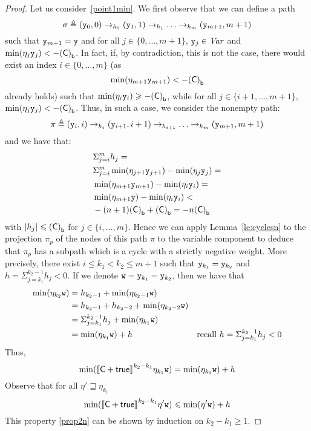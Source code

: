 \begin{proof}
  Let us consider~\ref{point1min}. We first observe that we
  can define a path
  \begin{equation}
    \label{eq:fixn}
    \sigma \veq (\var[y]_0, 0) \to_{h_0} (\var[y]_1, 1) \to_{h_1}
    \ldots \to_{h_m} (\var[y]_{m+1}, m+1)
  \end{equation}
  such that \(\var[y]_{m+1}=\var[y]\) and for all \(j \in \{0,\ldots, m+1\}\), 
  \(\var[y]_j\in \Var\)  and
  \(\min(\eta_{j} \var[y]_{j}) < -\lbound{\com}\).
  In fact, if, by contradiction, this is not the case, there would
  exist an index \(i \in \{0,\ldots, m\}\) (as
  \[\min(\eta_{m+1} \var[y]_{m+1}) < -\lbound{\com}\] already holds)
  such that \(\min(\eta_{i} \var[y]_{i}) \geq -\lbound{\com}\), while
  for all \(j \in \{i+1,\ldots, m+1\}\),
  \(\min(\eta_{j} \var[y]_j) < -\lbound{\com}\).  Thus, in such a
  case, we consider the nonempty path:
  \[\pi \veq (\var[y]_i, i) \to_{h_i} (\var[y]_{i+1}, i+1) \to_{h_{i+1}} \ldots
  \to_{h_m} (\var[y]_{m+1}, m+1)\]
  and we have that:
  \begin{align*}
    &\Sigma_{j=i}^m h_j =\\ 
    &\Sigma_{j=i}^m \min(\eta_{j+1} \var[y]_{j+1}) - \min(\eta_j \var[y]_{j}) =\\
    &\min(\eta_{m+1} \var[y]_{m+1}) - \min(\eta_i \var[y]_{i}) =\\
    &\min(\eta_{m+1} \var[y]) - \min(\eta_i \var[y]_{i}) < \\
    &  - (n+1) \lbound{\com} + \lbound{\com} = - n \lbound{\com}
  \end{align*}
  with \(|h_j| \leq \lbound{\com}\) for \(j \in \{i,\ldots,
  m\}\). Hence we can apply Lemma~\ref{le:cyclesn} to the projection
  \(\pi_p\) of the nodes of this path \(\pi\) to the variable
  component to deduce that \(\pi_p\) has a subpath which is a cycle
  with a strictly negative weight.  More precisely, there exist
  \(i \leq k_1 < k_2 \leq m+1\) such that
  \(\var[y]_{k_1} = \var[y]_{k_2}\) and
  \(h = \Sigma_{j=k_1}^{k_2-1} h_j < 0\). If we denote
  \(\var[w] = \var[y]_{k_1} = \var[y]_{k_2}\), then we have that
  \begin{align*}
    \min(\eta_{k_2} \var[w]) & =  h_{k_2-1}  + \min(\eta_{k_2-1} \var[w]) \\
                             & =  h_{k_2-1} + h_{k_2-2} + \min(\eta_{k_2-2} \var[w])  \\
                             & = \Sigma_{j=k_1}^{k_2-1} h_j + \min(\eta_{k_1} \var[w])  \\
                             & = \min(\eta_{k_1} \var[w]) + h & \text{recall } h = \Sigma_{j=k_1}^{k_2-1} h_j < 0
  \end{align*}
  Thus,
  \[\min(\semi{\com \ndet \tru}^{k_2-k_1} \eta_{k_1} \var[w]) = \min(\eta_{k_1}
  \var[w]) + h\] 
  Observe that for all \(\eta' \sqsupseteq \eta_{k_1}\)
  \begin{equation}\label{prop2n}
    \min(\semi{\com \ndet \tru}^{k_2-k_1} \eta' \var[w]) \leq \min(\eta'
    \var[w]) + h
  \end{equation}
  This property \eqref{prop2n} can be shown by induction on \(k_2-k_1 \geq 1\).
  

\end{proof}
